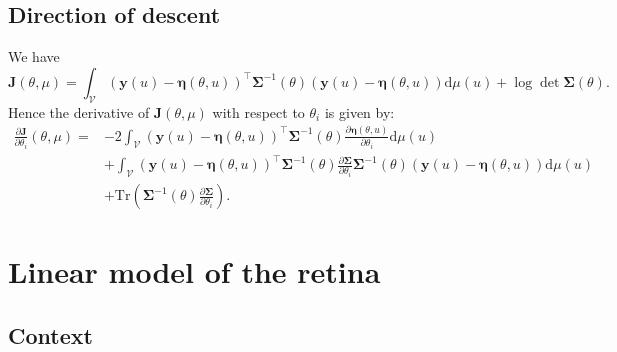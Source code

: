 \documentclass[twocolumn]{autart}
\theoremstyle{definition}
\theoremstyle{remark}
\newcommand{\diff}{\mathrm{d}}
\newcommand{\Tr}{\mathrm{Tr}}
\newcommand{\V}{\mathcal{V}}
\newcommand{\yb}{\mathbf{y}}
\newcommand{\Jb}{\mathbf{J}}
\newcommand{\etab}{\boldsymbol{\eta}}
\newcommand{\Sigmab}{\boldsymbol{\Sigma}}
\begin{document}
\subsection{Direction of descent}
We have
\begin{equation}
\Jb(\theta,\mu)
=
\int_\V
(\yb(u)-\etab(\theta,u))^\top 
\Sigmab^{-1}(\theta)
(\yb(u)-\etab(\theta,u))\diff \mu(u)+\log\det \Sigmab(\theta).
\end{equation}
Hence the derivative of $\Jb(\theta,\mu)$ with respect to $\theta_i$ is given by:
\begin{equation}\label{E:dJdtheta_i}
\begin{aligned}
\frac{\partial \Jb}{\partial\theta_i}(\theta,\mu)
=&
-2\int_\V
(\yb(u)-\etab(\theta,u))^\top 
\Sigmab^{-1}(\theta)
\frac{\partial\etab(\theta,u)}{\partial \theta_i}\diff \mu(u)
\\
&+
\int_\V
(\yb(u)-\etab(\theta,u))^\top 
\Sigmab^{-1}(\theta) \frac{\partial \Sigmab}{\partial\theta_i}\Sigmab^{-1}(\theta)
(\yb(u)-\etab(\theta,u))\diff \mu(u)
\\&
+
\Tr\left(\Sigmab^{-1}(\theta) \frac{\partial \Sigmab}{\partial\theta_i}\right).
\end{aligned}
\end{equation}

\section{Linear model of the retina}

\subsection{Context}\label{S:Context}
 
\end{document}
